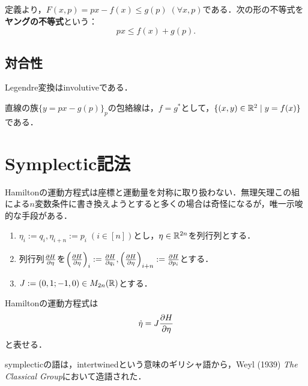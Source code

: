 \documentclass[uplatex, dvipdfmx]{jsreport}
\begin{document}
\begin{definition}
    定義より，$F(x,p)=px-f(x)\le g(p)\;(\forall x,p)$である．次の形の不等式を\textbf{ヤングの不等式}という：
    \[ px\le f(x)+g(p). \]
\end{definition}

\subsection{対合性}

\begin{theorem}
    Legendre変換はinvolutiveである．
\end{theorem}

\begin{corollary}
    直線の族$\{y=px-g(p)\}_{p}$の包絡線は，$f=g^*$として，$\{(x,y)\in\mathbb{R}^2\mid y=f(x)\}$である．
\end{corollary}

\section{Symplectic記法}

\begin{tcolorbox}[colframe=ForestGreen, colback=ForestGreen!10!white,breakable,colbacktitle=ForestGreen!40!white,coltitle=black,fonttitle=\bfseries\sffamily,
title=]
    Hamiltonの運動方程式は座標と運動量を対称に取り扱わない．無理矢理この組による$n$変数条件に書き換えようとすると多くの場合は奇怪になるが，唯一示唆的な手段がある．
\end{tcolorbox}

\begin{definition}\mbox{}
    \begin{enumerate}
        \item $\eta_i:=q_i,\eta_{i+n}:=p_i\;(i\in[n])$とし，$\eta\in\mathbb{R}^{2n}$を列行列とする．
        \item 列行列$\frac{\partial H}{\partial \eta}$を$\left(\frac{\partial H}{\partial \eta}\right)_i:=\frac{\partial H}{\partial q_i},\left(\frac{\partial H}{\partial \eta}\right)_{i+n}:=\frac{\partial H}{\partial p_i}$とする．
        \item $J:=(0,1;-1,0)\in M_{2n}(\mathbb{R})$とする．
    \end{enumerate}
\end{definition}

\begin{theorem}
    Hamiltonの運動方程式は
    \[\dot{\eta}=J\frac{\partial H}{\partial \eta}\]
    と表せる．
\end{theorem}
\begin{history}
    symplecticの語は，intertwinedという意味のギリシャ語から，Weyl (1939) \textit{The Classical Group}において造語された．
\end{history}
\end{document}
